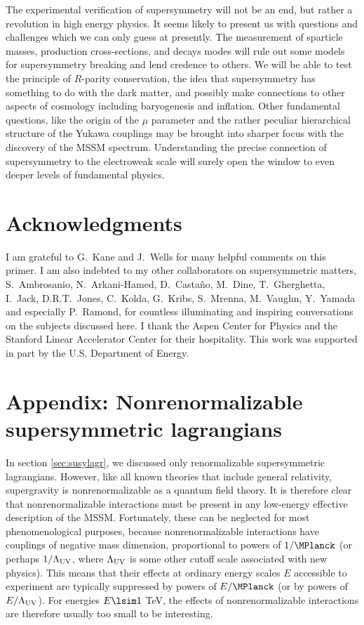 The experimental verification of supersymmetry will not be an end, but
rather a revolution in high energy physics. It seems likely to present us
with questions and challenges which we can only guess at presently. The
measurement of sparticle masses, production cross-sections, and decays
modes will rule out some models for supersymmetry breaking and lend
credence to others. We will be able to test the principle of $R$-parity
conservation, the idea that supersymmetry has something to do with the
dark matter, and possibly make connections to other aspects of cosmology
including baryogenesis and inflation. Other fundamental questions, like
the origin of the $\mu$ parameter and the rather peculiar hierarchical
structure of the Yukawa couplings may be brought into sharper focus with
the discovery of the MSSM spectrum. Understanding the precise connection
of supersymmetry to the electroweak scale will surely open the window to
even deeper levels of fundamental physics.

\section*{Acknowledgments}
I am grateful to G.~Kane and J.~Wells for many helpful comments
on this primer.
I am also indebted to my other collaborators
on supersymmetric matters,
S.~Ambrosanio,
N.~Arkani-Hamed,
D.~Casta\~no,
M.~Dine,
T.~Gherghetta,
I.~Jack, 
D.R.T.~Jones,
C.~Kolda,
G.~Kribs,
S.~Mrenna,
M.~Vaughn, 
Y.~Yamada
and especially P.~Ramond, for countless illuminating and
inspiring conversations on the subjects discussed here.
I thank the Aspen Center for Physics and the Stanford Linear
Accelerator Center for their hospitality.
This work was supported in part by the U.S. Department of Energy.

\section*{Appendix: Nonrenormalizable supersymmetric
lagrangians}\label{appendix}
\renewcommand{\theequation}{A.\arabic{equation}}
\setcounter{footnote}{1}

In section \ref{sec:susylagr}, we discussed only renormalizable
supersymmetric lagrangians. However, like all known theories that
include general relativity, supergravity is nonrenormalizable as a
quantum field theory. It is therefore clear that nonrenormalizable
interactions must be present in any low-energy effective description
of the MSSM. Fortunately, these can be neglected for most
phenomenological purposes, because nonrenormalizable
interactions have couplings of negative mass dimension, proportional to
powers of 
$1/\MPlanck$ (or perhaps $1/\Lambda_{\rm UV}$, where $\Lambda_{\rm UV}$ is
some other
cutoff scale associated with new physics). This means that their
effects at ordinary energy scales $E$ accessible to experiment
are typically suppressed by powers of ${E/\MPlanck}$ (or by
powers of $E/\Lambda_{\rm UV}$). For energies $E\lsim 1$ TeV, the
effects of nonrenormalizable interactions are therefore usually too small
to be interesting.

